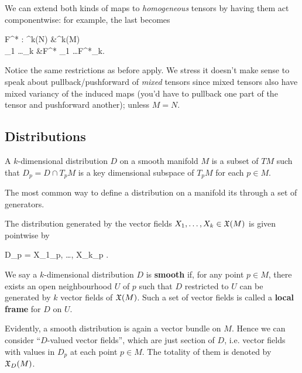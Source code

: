 \documentclass[main.tex]{subfiles}
\begin{document}
\begin{construction}
\label{const:pb_and_pf_of_tensors}
	We can extend both kinds of maps to \emph{homogeneous} tensors by having them act componentwise: for example, the last becomes
	\begin{eqalign}
		F^* : \Omega^k(N) &\longto \Omega^k(M)\\
		\omega_1 \wedge \ldots \wedge \omega_k &\longmapsto F^* \omega_1 \wedge \ldots \wedge F^*\omega_k.
	\end{eqalign}
	Notice the same restrictions as before apply. We stress it doesn't make sense to speak about pullback/pushforward of \emph{mixed} tensors since mixed tensors also have mixed variancy of the induced maps (you'd have to pullback one part of the tensor and pushforward another); unless $M=N$.
\end{construction}

\subsection{Distributions}
\begin{definition}
	A $k$-dimensional distribution $D$ on a smooth manifold $M$ is a subset of $TM$ such that $D_p = D \cap T_pM$ is a key dimensional subspace of $T_pM$ for each $p\in M$.
\end{definition}

The most common way to define a distribution on a manifold its through a set of generators.

\begin{definition}
	The distribution generated by the vector fields $X_1, \ldots, X_k \in \mathfrak{X}(M)$ is given pointwise by
	\begin{eqalign}
		D_p = \langle X_1\vert_p, \ldots, X_k\vert_p \rangle.
	\end{eqalign}
\end{definition}

\begin{definition}
	We say a $k$-dimensional distribution $D$ is \textbf{smooth} if, for any point $p \in M$, there exists an open neighbourhood $U$ of $p$ such that $D$ restricted to $U$ can be generated by $k$ vector fields of $\mathfrak{X}(M)$. Such a set of vector fields is called a \textbf{local frame} for $D$ on $U$.
\end{definition}

Evidently, a smooth distribution is again a vector bundle on $M$. Hence we can consider ``$D$-valued vector fields'', which are just section of $D$, i.e. vector fields with values in $D_p$ at each point $p \in M$. The totality of them is denoted by $\mathfrak{X}_D(M)$. 
\end{document}
